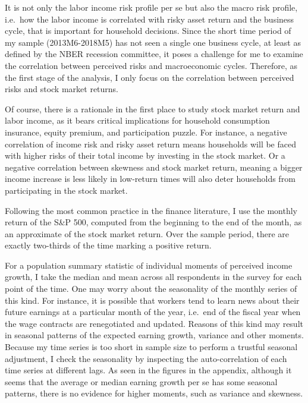 \documentclass[12pt,notitlepage,onecolumn,aps,pra]{article}
\begin{document}
It is not only the labor income risk profile per se but also the macro
risk profile, i.e.~how the labor income is correlated with risky asset
return and the business cycle, that is important for household
decisions. Since the short time period of my sample (2013M6-2018M5) has
not seen a single one business cycle, at least as defined by the NBER
recession committee, it poses a challenge for me to examine the
correlation between perceived risks and macroeconomic cycles. Therefore,
as the first stage of the analysis, I only focus on the correlation
between perceived risks and stock market returns.

Of course, there is a rationale in the first place to study stock market
return and labor income, as it bears critical implications for household
consumption insurance, equity premium, and participation puzzle. For
instance, a negative correlation of income risk and risky asset return
means households will be faced with higher risks of their total income
by investing in the stock market. Or a negative correlation between
skewness and stock market return, meaning a bigger income increase is
less likely in low-return times will also deter households from
participating in the stock market.

Following the most common practice in the finance literature, I use the
monthly return of the S\&P 500, computed from the beginning to the end
of the month, as an approximate of the stock market return. Over the
sample period, there are exactly two-thirds of the time marking a
positive return.

For a population summary statistic of individual moments of perceived
income growth, I take the median and mean across all respondents in the
survey for each point of the time. One may worry about the seasonality
of the monthly series of this kind. For instance, it is possible that
workers tend to learn news about their future earnings at a particular
month of the year, i.e.~end of the fiscal year when the wage contracts
are renegotiated and updated. Reasons of this kind may result in
seasonal patterns of the expected earning growth, variance and other
moments. Because my time series is too short in sample size to perform a
trustful seasonal adjustment, I check the seasonality by inspecting the
auto-correlation of each time series at different lags. As seen in the
figures in the appendix, although it seems that the average or median
earning growth per se has some seasonal patterns, there is no evidence
for higher moments, such as variance and skewness.
\end{document}
